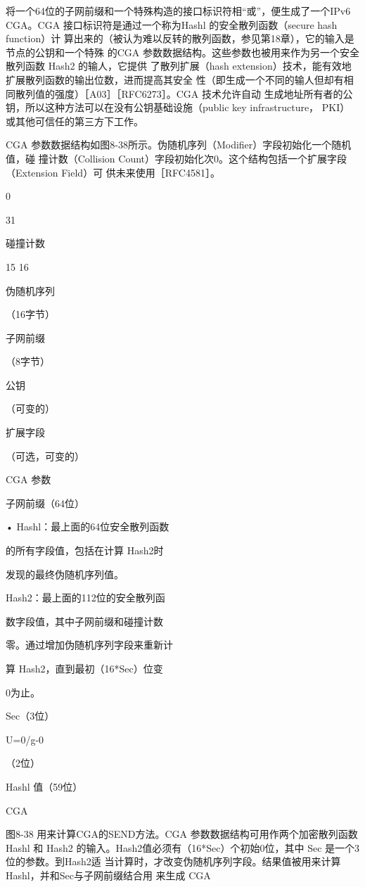 将一个64位的子网前缀和一个特殊构造的接口标识符相“或”，便生成了一个IPv6
CGA。CGA 接口标识符是通过一个称为Hashl 的安全散列函数（secure hash function）计
算出来的（被认为难以反转的散列函数，参见第18章），它的输入是节点的公钥和一个特殊
的CGA 参数数据结构。这些参数也被用来作为另一个安全散列函数 Hash2 的输人，它提供
了散列扩展（hash extension）技术，能有效地扩展散列函数的输出位数，进而提高其安全
性（即生成一个不同的输人但却有相同散列值的强度）［A03］［RFC6273］。CGA 技术允许自动
生成地址所有者的公钥，所以这种方法可以在没有公钥基础设施（public key infrastructure，
PKI） 或其他可信任的第三方下工作。

CGA 参数数据结构如图8-38所示。伪随机序列（Modifier）字段初始化一个随机值，碰
撞计数（Collision Count）字段初始化次0。这个结构包括一个扩展字段（Extension Field）可
供未来使用［RFC4581］。

0

31

碰撞计数

15 16

伪随机序列

（16字节）

子网前缀

（8字节）

公钥

（可变的）

扩展字段

（可选，可变的）

CGA 参数

子网前缀（64位）

• Hashl：最上面的64位安全散列函数

的所有字段值，包括在计算 Hash2时

发现的最终伪随机序列值。

Hash2：最上面的112位的安全散列函

数字段值，其中子网前缀和碰撞计数

零。通过增加伪随机序列字段来重新计

算 Hash2，直到最初（16*Sec）位变

0为止。

Sec（3位）

U=0/g-0

（2位）

Hashl 值（59位）

CGA

图8-38 用来计算CGA的SEND方法。CGA 参数数据结构可用作两个加密散列函数 Hashl 和 Hash2
的输入。Hash2值必须有（16*Sec）个初始0位，其中 Sec 是一个3位的参数。到Hash2适
当计算时，才改变伪随机序列字段。结果值被用来计算 Hashl，并和Sec与子网前缀结合用
来生成 CGA


